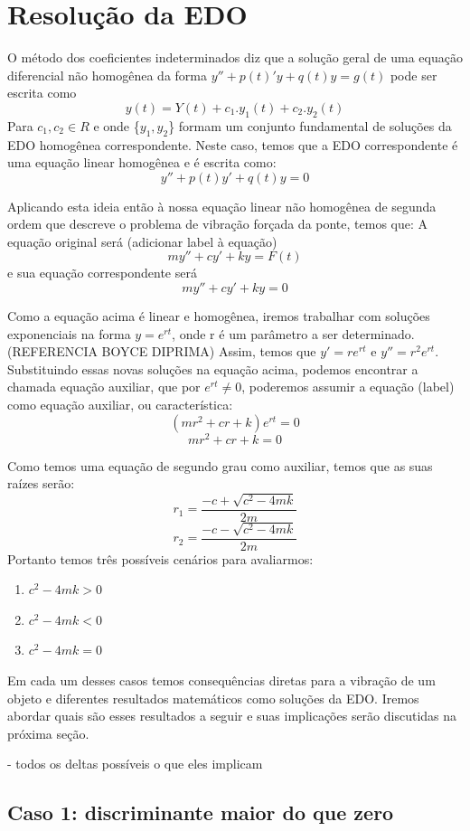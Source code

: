 \documentclass[]{article}
\begin{document}
\pagebreak 
\section{Resolução da EDO}
O método dos coeficientes indeterminados diz que a solução geral de uma equação 
diferencial não homogênea
da forma $y'' + p(t)'y + q(t)y = g(t)$ pode ser escrita como
\[ y(t) = Y(t) + c_1.y_1(t) + c_2.y_2(t)\] 
Para $c_1, c_2 \in R$ e onde \{$y_1,y_2$\} formam um conjunto fundamental de soluções
da EDO homogênea correspondente. Neste caso, temos que a EDO correspondente é uma equação
linear homogênea e é escrita como: 
\[y'' + p(t)y' + q(t)y = 0\] 

Aplicando esta ideia então à nossa equação linear não homogênea de segunda ordem que descreve o problema 
de vibração forçada da ponte, temos que:
A equação original será (adicionar label à equação)
\[  my'' + cy'  + ky = F(t)\] 
e sua equação correspondente será
\[ my'' + cy'  + ky = 0\]

Como a equação acima é linear e homogênea, iremos trabalhar com soluções exponenciais na forma $y=e^{rt}$, onde r é um parâmetro a ser determinado. (REFERENCIA BOYCE DIPRIMA)
Assim, temos que $y'=re^{rt}$  e $y''=r^2 e^{rt}$. Substituindo essas novas soluções na equação acima, podemos encontrar a chamada equação auxiliar,
que por $e^{rt}\neq 0$, poderemos assumir a equação (label) como equação auxiliar, ou característica:
\[ (mr^2 + cr  + k)e^{rt} = 0\] 
\[ mr^2 + cr  + k = 0\] 

Como temos uma equação de segundo grau como auxiliar, temos que as suas raízes serão:
\[ r_1 = \frac{-c + \sqrt{c^2 - 4mk}}{2m}\] \[ r_2 = \frac{-c - \sqrt{c^2 - 4mk}}{2m} \]
Portanto temos três possíveis cenários para avaliarmos:
\begin{enumerate}
    \item $c^2 - 4mk > 0$
    \item $c^2 - 4mk < 0$
    \item $c^2 - 4mk = 0$
\end{enumerate}

Em cada um desses casos temos consequências diretas para a vibração de um objeto e
diferentes resultados matemáticos como soluções da EDO. Iremos abordar
quais são esses resultados a seguir e suas implicações serão discutidas na próxima seção.
\pagebreak

- todos os deltas possíveis o que eles implicam

\subsection{Caso 1: discriminante maior do que zero}
\end{document}
